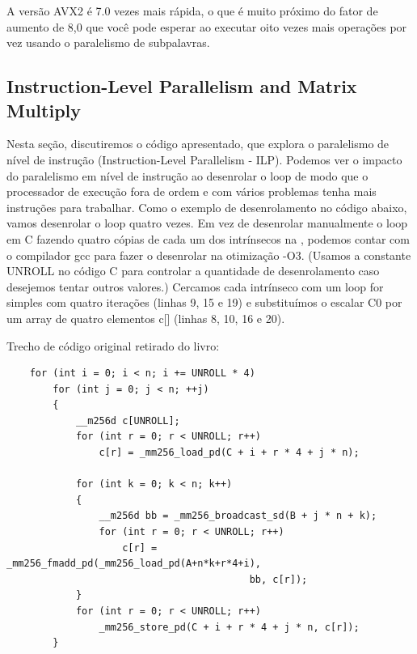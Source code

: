 \documentclass[12pt]{article}
\begin{document}
A versão AVX2 é 7.0 vezes mais rápida, o que é muito próximo do fator de aumento de 8,0 que você pode esperar ao executar oito vezes mais operações por vez usando o paralelismo de subpalavras.

\newpage
\newpage

\subsection{Instruction-Level Parallelism and Matrix Multiply}

Nesta seção, discutiremos o código apresentado, que explora o paralelismo de nível de instrução (Instruction-Level Parallelism - ILP). Podemos ver o impacto do paralelismo em nível de instrução ao desenrolar o loop de modo que o processador de execução fora de ordem e com vários problemas tenha mais instruções para trabalhar. Como o exemplo de desenrolamento no código abaixo, vamos desenrolar o loop quatro vezes. Em vez de desenrolar manualmente o loop em C fazendo quatro cópias de cada um dos intrínsecos na , podemos contar com o compilador gcc para fazer o desenrolar na otimização -O3. (Usamos a constante UNROLL no código C para controlar a quantidade de desenrolamento caso desejemos tentar outros valores.) Cercamos cada intrínseco com um loop for simples com quatro iterações (linhas 9, 15 e 19) e substituímos o escalar C0 por um array de quatro elementos c[] (linhas 8, 10, 16 e 20).

Trecho de código original retirado do livro:

\begin{lstlisting}
    for (int i = 0; i < n; i += UNROLL * 4)
        for (int j = 0; j < n; ++j)
        {
            __m256d c[UNROLL];
            for (int r = 0; r < UNROLL; r++)
                c[r] = _mm256_load_pd(C + i + r * 4 + j * n);
    
            for (int k = 0; k < n; k++)
            {
                __m256d bb = _mm256_broadcast_sd(B + j * n + k);
                for (int r = 0; r < UNROLL; r++)
                    c[r] = _mm256_fmadd_pd(_mm256_load_pd(A+n*k+r*4+i), 
                                          bb, c[r]);
            }
            for (int r = 0; r < UNROLL; r++)
                _mm256_store_pd(C + i + r * 4 + j * n, c[r]);
        }
\end{lstlisting}
\end{document}
